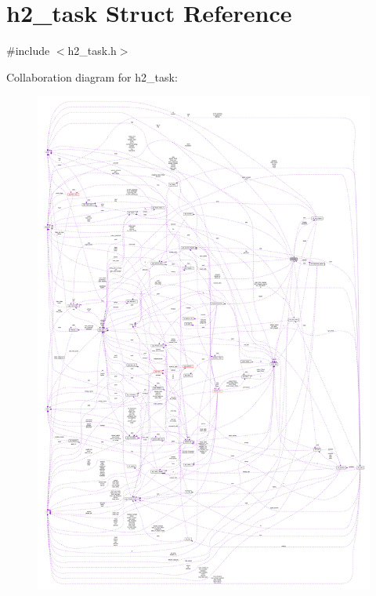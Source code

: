 \hypertarget{structh2__task}{}\section{h2\+\_\+task Struct Reference}
\label{structh2__task}


{\ttfamily \#include $<$h2\+\_\+task.\+h$>$}



Collaboration diagram for h2\+\_\+task\+:
\nopagebreak
\begin{figure}[H]
\begin{center}
\leavevmode
\includegraphics[width=350pt]{structh2__task__coll__graph}
\end{center}
\end{figure}
